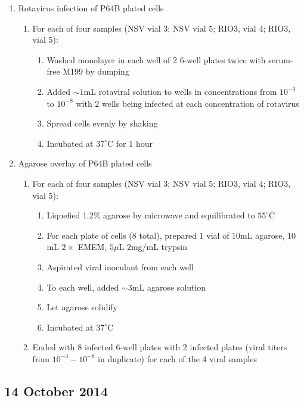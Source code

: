 \begin{enumerate}
	\item Rotavirus infection of P64B plated cells
		\begin{enumerate}
			\item For each of four samples (NSV vial 3; NSV vial 5; RIO3, vial 4; RIO3, vial 5):
				\begin{enumerate}
					\item Washed monolayer in each well of 2 6-well plates twice with serum-free M199 by dumping
					\item Added $\sim 1$mL rotaviral solution to wells in concentrations from $10^{-3}$ to $10^{-8}$ with 2 wells being infected at each concentration of rotavirus
					\item Spread cells evenly by shaking
					\item Incubated at $37^{\circ}$C for 1 hour
				\end{enumerate}
		\end{enumerate}
	\item Agarose overlay of P64B plated cells
		\begin{enumerate}
			\item For each of four samples (NSV vial 3; NSV vial 5; RIO3, vial 4; RIO3, vial 5):
				\begin{enumerate}
					\item Liquefied 1.2\% agarose by microwave and equilibrated to $55^{\circ}$C
					\item For each plate of cells (8 total), prepared 1 vial of $10$mL agarose, $10$mL $2\times$ EMEM, $5\mu$L $2$mg/mL trypsin
					\item Aspirated viral inoculant from each well
					\item To each well, added $\sim3$mL agarose solution
					\item Let agarose solidify
					\item Incubated at $37^{\circ}$C
				\end{enumerate}
			\item Ended with 8 infected 6-well plates with 2 infected plates (viral titers from $10^{-3}-10^{-8}$ in duplicate) for each of the 4 viral samples
		\end{enumerate}
\end{enumerate}

\subsection*{14 October 2014}


